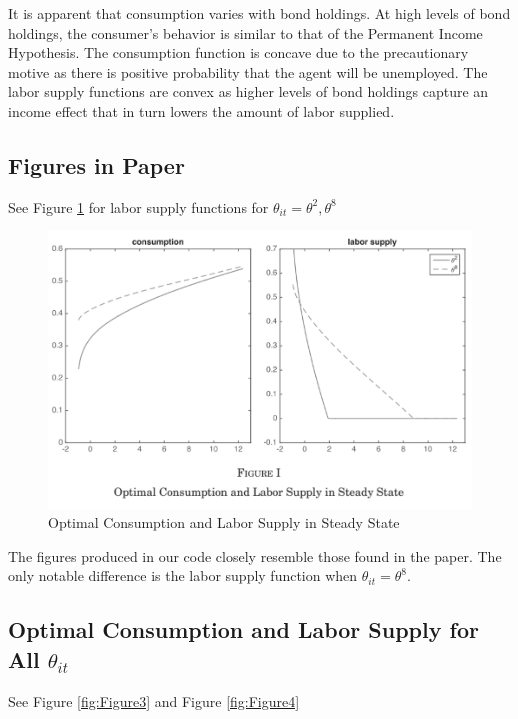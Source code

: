 \documentclass[./GL2017.tex]{subfiles}
\begin{document}
It is apparent that consumption varies with bond holdings.  At high levels of bond holdings, the consumer's behavior is similar to that of the Permanent Income Hypothesis. The consumption function is concave due to the precautionary motive as there is positive probability that the agent will be unemployed. The labor supply functions are convex as higher levels of bond holdings capture an income effect that in turn lowers the amount of labor supplied. 



\subsection{Figures in Paper}
See Figure \ref{fig:Figure5} for labor supply functions for $ \theta_{it} = \theta^{2} , \theta^{8}$

\begin{figure}[h]
\centerline{\includegraphics[width=6in]{Figures/Figure5.png}}
\label{fig:Figure5}

\caption{Optimal Consumption and Labor Supply in Steady State}
\end{figure}
The figures produced in our code closely resemble those found in the paper. The only notable difference is the labor supply function when $ \theta_{it} = \theta^{8}$.

\subsection{Optimal Consumption and Labor Supply for All $\theta_{it}$}
See Figure \ref{fig:Figure3} and Figure \ref{fig:Figure4}
\end{document}

